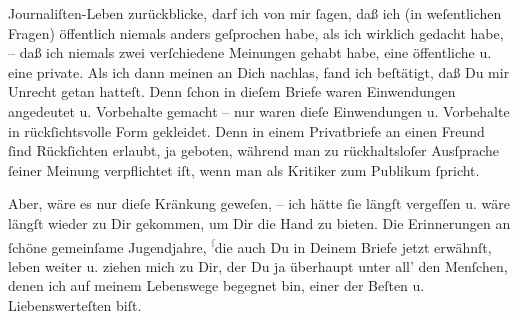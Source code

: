                Journaliſten-Leben zurückblicke, darf ich von mir ſagen, daß ich (in weſentlichen
               Fragen) öffentlich niemals anders geſprochen habe, als ich wirklich gedacht habe, –
               daß ich niemals zwei verſchiedene Meinungen gehabt habe, eine öffentliche {\pb}u. eine private. Als ich dann meinen \label{K_L03478-5v}\label{K_L03478-5} an Dich
               nachlas, fand ich beſtätigt, daß Du mir Unrecht getan hatteſt. Denn ſchon in dieſem
               Briefe waren Einwendungen angedeutet u. Vorbehalte gemacht – nur waren dieſe
               Einwendungen u. Vorbehalte in rückſichtsvolle Form gekleidet. Denn in einem
               Privatbriefe an einen Freund ſind Rückſichten erlaubt, ja geboten, während man zu
               rückhaltsloſer Ausſprache ſeiner Meinung verpflichtet iſt, wenn man als Kritiker zum
               Publikum ſpricht.\pend
           
\pstart
           Aber, wäre es nur {\pb}dieſe Kränkung geweſen, – ich
               hätte ſie längſt vergeſſen u. wäre längſt wieder zu Dir gekommen, um Dir die Hand zu
               bieten. Die Erinnerungen an ſchöne gemeinſame Jugendjahre, \substVorne{}\textsuperscript{\textcolor{gray}{ſ}}\substDazwischen{}d\substHinten{}ie auch Du in Deinem Briefe jetzt erwähnſt, leben weiter u. ziehen mich zu
               Dir, der Du ja überhaupt unter all’ den Menſchen, denen ich auf meinem Lebenswege
               begegnet bin, einer der Beſten u. Liebenswerteſten biſt.\pend
           
